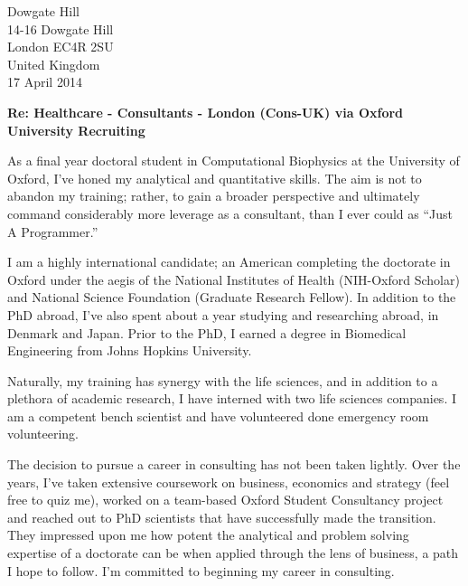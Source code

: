 \documentclass[a4paper]{../res}
\begin{document}
 
\begin{sloppypar}
 
%


\begin{resume} 
Dowgate Hill \\
14-16 Dowgate Hill \\
London EC4R 2SU \\
United Kingdom \\
 
17 April 2014



\textbf{Re: Healthcare - Consultants - London (Cons-UK) via Oxford University Recruiting}

As a final year doctoral student in Computational Biophysics at the University of Oxford, I've honed my analytical and quantitative skills. The aim is not to abandon my training; rather, to gain a broader perspective and ultimately command considerably more leverage as a consultant, than I ever could as ``Just A Programmer.'' 

I am a highly international candidate; an American completing the doctorate in Oxford under the aegis of the National Institutes of Health (NIH-Oxford Scholar) and National Science Foundation (Graduate Research Fellow). In addition to the PhD abroad, I've also spent about a year studying and researching abroad, in Denmark and Japan. Prior to the PhD, I earned a degree in Biomedical Engineering from Johns Hopkins University.

Naturally, my training has synergy with the life sciences, and in addition to a plethora of academic research, I have interned with two life sciences companies. I am a competent bench scientist and have volunteered done emergency room volunteering.

The decision to pursue a career in consulting has not been taken lightly. Over the years, I've taken extensive coursework on business, economics and strategy (feel free to quiz me), worked on a team-based Oxford Student Consultancy project and reached out to PhD scientists that have successfully made the transition. They impressed upon me how potent the analytical and problem solving expertise of a doctorate can be when applied through the lens of business, a path I hope to follow. I'm committed to beginning my career in consulting.


\end{resume}
\end{sloppypar}
\end{document}
